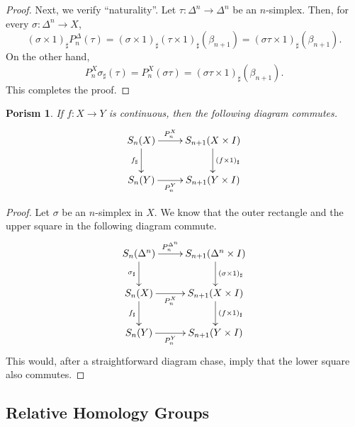 \documentclass[10pt]{article}
\theoremstyle{thmstyle}
\theoremstyle{defstyle}
\newtheorem{porism}[theorem]{Porism}
\begin{document}
\begin{proof}
    Next, we verify ``naturality''. Let $\tau:\Delta^n\to\Delta^n$ be an $n$-simplex. Then, for every $\sigma: \Delta^n\to X$,
    \begin{equation*}
        (\sigma\times 1)_{\sharp} P^\Delta_n(\tau) = (\sigma\times 1)_{\sharp}(\tau\times 1)_{\sharp}(\beta_{n + 1}) = (\sigma\tau\times 1)_{\sharp}(\beta_{n + 1}).
    \end{equation*}
    On the other hand, 
    \begin{equation*}
        P^X_n\sigma_\sharp(\tau) = P^X_n(\sigma\tau) = (\sigma\tau\times 1)_{\sharp}(\beta_{n + 1}).
    \end{equation*}
    This completes the proof.
\end{proof}

\begin{porism}
    If $f: X\to Y$ is continuous, then the following diagram commutes. 
    \begin{equation*}
        \xymatrix {
            S_n(X)\ar[r]^-{P^X_n}\ar[d]_{f_\sharp} & S_{n + 1}(X\times I)\ar[d]^{(f\times 1)_\sharp}\\
            S_n(Y)\ar[r]_-{P^Y_n} & S_{n + 1}(Y\times I)
        }
    \end{equation*}
\end{porism}
\begin{proof}
    Let $\sigma$ be an $n$-simplex in $X$. We know that the outer rectangle and the upper square in the following diagram commute.  
    \begin{equation*}
        \xymatrix {
            S_n(\Delta^n)\ar[r]^-{P_n^{\Delta^n}}\ar[d]_{\sigma_\sharp} & S_{n + 1}(\Delta^n\times I)\ar[d]^{(\sigma\times 1)_\sharp}\\
            S_n(X)\ar[r]_-{P_n^{X}}\ar[d]_{f_\sharp} & S_{n + 1}(X\times I)\ar[d]^{(f\times 1)_\sharp}\\
            S_n(Y)\ar[r]_-{P^Y_n} & S_{n + 1}(Y\times I)
        }
    \end{equation*}
    This would, after a straightforward diagram chase, imply that the lower square also commutes.
\end{proof}

\subsection{Relative Homology Groups}
\end{document}
